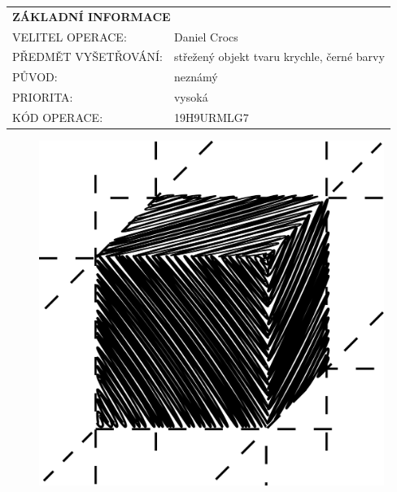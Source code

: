 \documentclass[a4paper, 11pt]{article}
\newlength{\fontheight}
\def\bottomrulewidth{0.3mm}		%
\def\tabtitleextraheight{5pt}	%
\def\tablestretch{1.4}			%
\newcommand{\blackcell}{\cellcolor{black} \color{white} \ttfamily \bfseries}
\newcommand{\ti}[2]{\ttfamily \MakeUppercase{#1}: & \ttfamily #2 \\ \midrule}
\newcommand{\lti}[2]{\ttfamily \MakeUppercase{#1}: & \ttfamily #2 \\ \bottomrule[\bottomrulewidth]}
\newcommand{\tabtitle}[2]{\multicolumn{#1}{l}{\blackcell \MakeUppercase{#2}\rule{0pt}{\dimexpr \fontheight + 1pt + \tabtitleextraheight \relax} } \\ [\tabtitleextraheight]}
\begin{document}
	\noindent
	\begin{minipage}[t]{0.62\textwidth}
		\begin{table}[H]
			\renewcommand\tabularxcolumn[1]{m{#1}}
			\def\arraystretch{\tablestretch}
			\begin{tabularx}{\textwidth}{l X}
				\tabtitle{2}{základní informace}
				\ti{velitel operace}{Daniel Crocs}
				\ti{předmět vyšetřování}{střežený objekt tvaru krychle, černé barvy}
				\ti{původ}{neznámý}
				\ti{priorita}{vysoká}
				\lti{kód operace}{19H9URMLG7}
			\end{tabularx}
		\end{table}
	\end{minipage}
	\begin{minipage}[t]{0.33\textwidth}
		\begin{figure}[H]
			\setlength{\fboxsep}{0pt}
			\hspace*{0.1\textwidth}
			\includegraphics[width=\textwidth]{sources/cube.png}
		\end{figure}
	\end{minipage}
\end{document}
